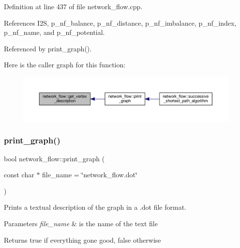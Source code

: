 Definition at line 437 of file network\+\_\+flow.\+cpp.



References I2S, p\+\_\+nf\+\_\+balance, p\+\_\+nf\+\_\+distance, p\+\_\+nf\+\_\+imbalance, p\+\_\+nf\+\_\+index, p\+\_\+nf\+\_\+name, and p\+\_\+nf\+\_\+potential.



Referenced by print\+\_\+graph().

Here is the caller graph for this function\+:
\nopagebreak
\begin{figure}[H]
\begin{center}
\leavevmode
\includegraphics[width=350pt]{d2/d4f/classnetwork__flow_aab892c67c8c4cc7049425026abb761d3_icgraph}
\end{center}
\end{figure}
\mbox{\label{classnetwork__flow_ac934a543bc088ad9768b9938b4f19145}} 
\subsubsection{\texorpdfstring{print\+\_\+graph()}{print\_graph()}}
{\footnotesize\ttfamily bool network\+\_\+flow\+::print\+\_\+graph (\begin{DoxyParamCaption}\item[{const char $\ast$}]{file\+\_\+name = {\ttfamily \char`\"{}network\+\_\+flow.dot\char`\"{}} }\end{DoxyParamCaption})}



Prints a textual description of the graph in a .dot file format. 


\begin{DoxyParams}{Parameters}
{\em file\+\_\+name} & is the name of the text file \\
\hline
\end{DoxyParams}
\begin{DoxyReturn}{Returns}
true if everything gone good, false otherwise 
\end{DoxyReturn}


